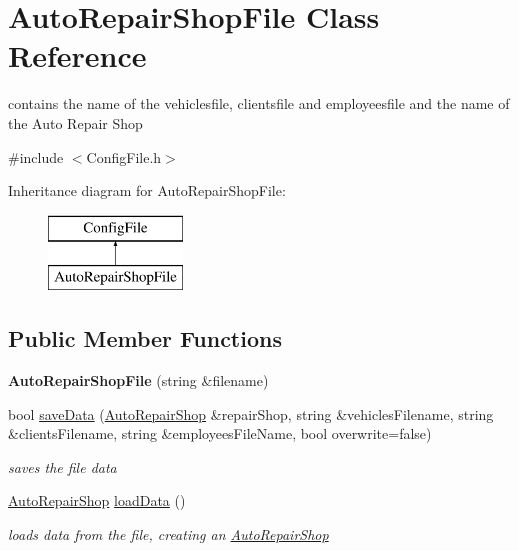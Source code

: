 \hypertarget{class_auto_repair_shop_file}{}\section{Auto\+Repair\+Shop\+File Class Reference}
\label{class_auto_repair_shop_file}


contains the name of the vehiclesfile, clientsfile and employeesfile and the name of the Auto Repair Shop  




{\ttfamily \#include $<$Config\+File.\+h$>$}

Inheritance diagram for Auto\+Repair\+Shop\+File\+:\begin{figure}[H]
\begin{center}
\leavevmode
\includegraphics[height=2.000000cm]{class_auto_repair_shop_file}
\end{center}
\end{figure}
\subsection*{Public Member Functions}
\begin{DoxyCompactItemize}
\item 
\hypertarget{class_auto_repair_shop_file_a4b145da740e34dab9699072e5fb2bdb2}{}{\bfseries Auto\+Repair\+Shop\+File} (string \&filename)\label{class_auto_repair_shop_file_a4b145da740e34dab9699072e5fb2bdb2}

\item 
\hypertarget{class_auto_repair_shop_file_a5a695e232fcd555e0b735334ed4311d6}{}bool \hyperlink{class_auto_repair_shop_file_a5a695e232fcd555e0b735334ed4311d6}{save\+Data} (\hyperlink{class_auto_repair_shop}{Auto\+Repair\+Shop} \&repair\+Shop, string \&vehicles\+Filename, string \&clients\+Filename, string \&employees\+File\+Name, bool overwrite=false)\label{class_auto_repair_shop_file_a5a695e232fcd555e0b735334ed4311d6}

\begin{DoxyCompactList}\small\item\em saves the file data \end{DoxyCompactList}\item 
\hypertarget{class_auto_repair_shop_file_a52b87c845d50b6c8a8e9374cdeb1101a}{}\hyperlink{class_auto_repair_shop}{Auto\+Repair\+Shop} \hyperlink{class_auto_repair_shop_file_a52b87c845d50b6c8a8e9374cdeb1101a}{load\+Data} ()\label{class_auto_repair_shop_file_a52b87c845d50b6c8a8e9374cdeb1101a}

\begin{DoxyCompactList}\small\item\em loads data from the file, creating an \hyperlink{class_auto_repair_shop}{Auto\+Repair\+Shop} \end{DoxyCompactList}\end{DoxyCompactItemize}
